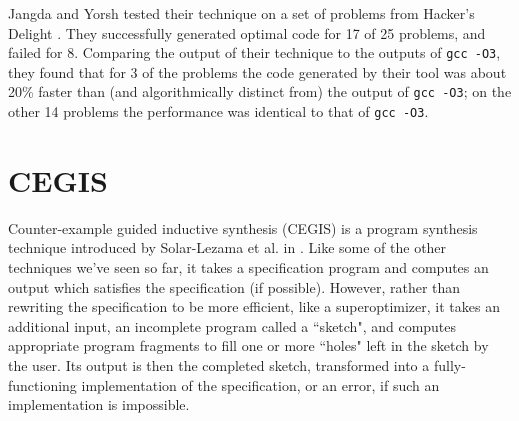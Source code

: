 \documentclass[12pt,twoside]{reedthesis}
\begin{document}
            Jangda and Yorsh tested their technique on a set of problems from Hacker's Delight \cite{warren2013hackers}.
            They successfully generated optimal code for 17 of 25 problems, and failed for 8.
            Comparing the output of their technique to the outputs of \texttt{gcc -O3}\footnotemark, they found that for 3 of the problems the code generated by their tool was about 20\% faster than (and algorithmically distinct from) the output of \texttt{gcc -O3}; on the other 14 problems the performance was identical to that of \texttt{gcc -O3}.
            

    \section{CEGIS}
        Counter-example guided inductive synthesis (CEGIS) is a program synthesis technique introduced by Solar-Lezama et al. in \cite{solar-lezama2006sketch}.
        Like some of the other techniques we've seen so far, it takes a specification program and computes an output which satisfies the specification (if possible).
        However, rather than rewriting the specification to be more efficient, like a superoptimizer, it takes an additional input, an incomplete program called a ``sketch", and computes appropriate program fragments to fill one or more ``holes" left in the sketch by the user.
        Its output is then the completed sketch, transformed into a fully-functioning implementation of the specification, or an error, if such an implementation is impossible.
        
\end{document}
